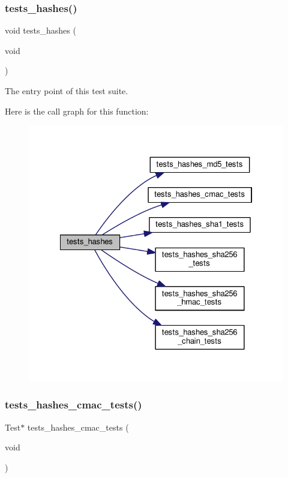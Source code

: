 \subsubsection{\texorpdfstring{tests\+\_\+hashes()}{tests\_hashes()}}
{\footnotesize\ttfamily void tests\+\_\+hashes (\begin{DoxyParamCaption}\item[{void}]{ }\end{DoxyParamCaption})}



The entry point of this test suite. 

Here is the call graph for this function\+:
\nopagebreak
\begin{figure}[H]
\begin{center}
\leavevmode
\includegraphics[width=322pt]{group__unittests_gac9c042435ff4e2597166100b86226d2a_cgraph}
\end{center}
\end{figure}
\mbox{\label{group__unittests_ga1a28ef20665a197204a84eb23688d340}} 
\subsubsection{\texorpdfstring{tests\+\_\+hashes\+\_\+cmac\+\_\+tests()}{tests\_hashes\_cmac\_tests()}}
{\footnotesize\ttfamily Test$\ast$ tests\+\_\+hashes\+\_\+cmac\+\_\+tests (\begin{DoxyParamCaption}\item[{void}]{ }\end{DoxyParamCaption})}



